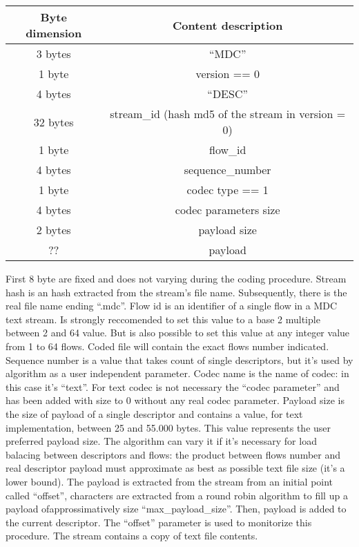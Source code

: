 \begin{center} \begin{tabular}{|c|c|}
\hline
Byte dimension & Content description\\
\hline \hline
3 bytes & ``MDC''\\
1 byte & version == 0\\
4 bytes & ``DESC''\\
32 bytes & stream\_id (hash md5 of the stream in version = 0)\\
1 byte & flow\_id\\
4 bytes & sequence\_number\\
1 byte & codec type == 1\\
4 bytes & codec parameters size\\
2 bytes & payload size\\
?? & payload\\
\hline
\end{tabular} \end{center}

First 8 byte are fixed and does not varying during the coding procedure.
Stream hash is an hash extracted from the stream's file name. Subsequently, there is the
real file name ending ``.mdc''. Flow id is an identifier of a single flow in a
MDC text stream. Is strongly reccomended to set this value to a base 2 multiple between 2 and 64 value. But is also possible to set this
value at any integer value from 1 to 64 flows. Coded file will contain the exact flows
number indicated. Sequence number is a value that takes count of single
descriptors, but it's used by algorithm as a user independent parameter. Codec
name is the name of codec: in this case it's ``text''. For text codec is not
necessary the ``codec parameter'' and has been added with size to 0 without any
real codec parameter. Payload size is the size of payload of a single descriptor and contains a value, for text implementation, between 25 and 55.000 bytes. This value represents the user preferred
payload size. The algorithm can vary it if it's necessary for load balacing between
descriptors and flows: the product between flows number and real descriptor payload must
approximate as best as possible text file size (it's a lower bound). The
payload is extracted from the stream from an initial point called ``offset'',
characters are extracted from a round robin algorithm to fill up a payload
ofapprossimatively size ``max\_payload\_size''. Then, payload is added to the
current descriptor. The ``offset'' parameter is used to monitorize this procedure. The stream contains a copy of text file contents.

